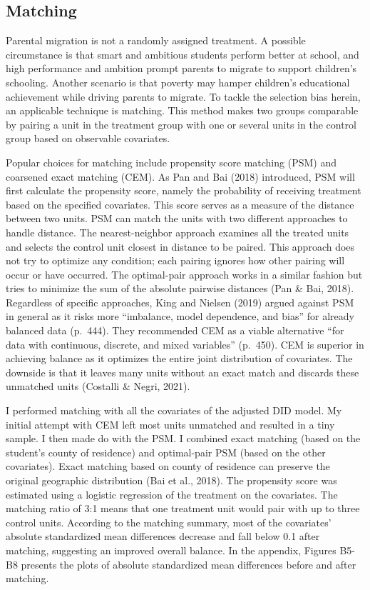 \documentclass[
  man,floatsintext]{apa7}
\begin{document}
\newpage

\hypertarget{matching}{%
\subsection{Matching}\label{matching}}

Parental migration is not a randomly assigned treatment. A possible circumstance is that smart and ambitious students perform better at school, and high performance and ambition prompt parents to migrate to support children's schooling. Another scenario is that poverty may hamper children's educational achievement while driving parents to migrate. To tackle the selection bias herein, an applicable technique is matching. This method makes two groups comparable by pairing a unit in the treatment group with one or several units in the control group based on observable covariates.

Popular choices for matching include propensity score matching (PSM) and coarsened exact matching (CEM). As Pan and Bai (2018) introduced, PSM will first calculate the propensity score, namely the probability of receiving treatment based on the specified covariates. This score serves as a measure of the distance between two units. PSM can match the units with two different approaches to handle distance. The nearest-neighbor approach examines all the treated units and selects the control unit closest in distance to be paired. This approach does not try to optimize any condition; each pairing ignores how other pairing will occur or have occurred. The optimal-pair approach works in a similar fashion but tries to minimize the sum of the absolute pairwise distances (Pan \& Bai, 2018). Regardless of specific approaches, King and Nielsen (2019) argued against PSM in general as it risks more ``imbalance, model dependence, and bias'' for already balanced data (p.~444). They recommended CEM as a viable alternative ``for data with continuous, discrete, and mixed variables'' (p.~450). CEM is superior in achieving balance as it optimizes the entire joint distribution of covariates. The downside is that it leaves many units without an exact match and discards these unmatched units (Costalli \& Negri, 2021).

I performed matching with all the covariates of the adjusted DID model. My initial attempt with CEM left most units unmatched and resulted in a tiny sample. I then made do with the PSM. I combined exact matching (based on the student's county of residence) and optimal-pair PSM (based on the other covariates). Exact matching based on county of residence can preserve the original geographic distribution (Bai et al., 2018). The propensity score was estimated using a logistic regression of the treatment on the covariates. The matching ratio of 3:1 means that one treatment unit would pair with up to three control units. According to the matching summary, most of the covariates' absolute standardized mean differences decrease and fall below 0.1 after matching, suggesting an improved overall balance. In the appendix, Figures B5-B8 presents the plots of absolute standardized mean differences before and after matching.
\end{document}
